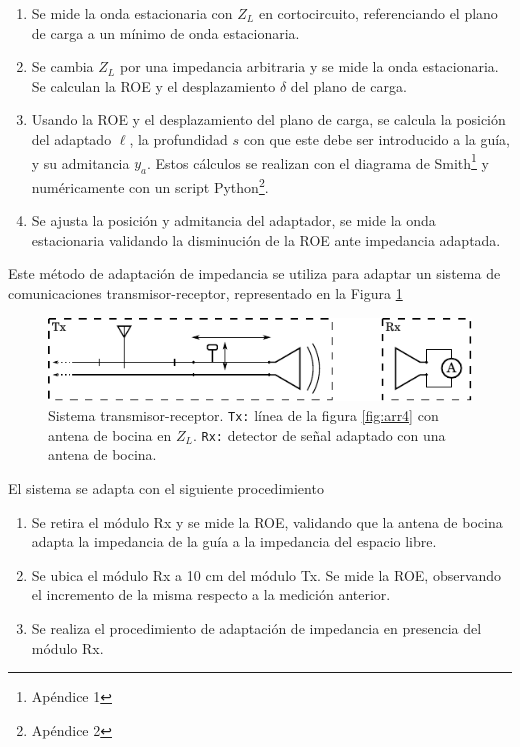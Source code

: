 \documentclass[11pt,a4paper]{article}
\begin{document}
\begin{multicols}{2}
\begin{enumerate}
    \item Se mide la onda estacionaria con $Z_L$ en cortocircuito, referenciando el plano de carga a un mínimo de onda estacionaria.
    \item Se cambia $Z_L$ por una impedancia arbitraria y se mide la onda estacionaria. Se calculan la ROE y el desplazamiento $\delta$ del plano de carga.
    \item Usando la ROE y el desplazamiento del plano de carga, se calcula la posición del adaptado $\ell$, la profundidad $s$ con que este debe ser introducido a la guía, y su admitancia $y_a$. 
    Estos cálculos se realizan con el diagrama de Smith\footnote{Apéndice 1} y numéricamente con un script Python\footnote{Apéndice 2}.
    \item Se ajusta la posición y admitancia del adaptador, se mide la onda estacionaria validando la disminución de la ROE ante impedancia adaptada.
\end{enumerate}

Este método de adaptación de impedancia se utiliza para adaptar un sistema de comunicaciones transmisor-receptor, representado en la Figura \ref{fig:sistema}

\begin{figure}[H]
    \centering
    \includegraphics[width=\linewidth]{Images/sistema.pdf}
    \caption{Sistema transmisor-receptor.
    \texttt{Tx:} línea de la figura \ref{fig:arr4} con antena de bocina en $Z_L$. 
    \texttt{Rx:} detector de señal adaptado con una antena de bocina.}
    \label{fig:sistema}
\end{figure}

El sistema se adapta con el siguiente procedimiento
\begin{enumerate}
    \item Se retira el módulo Rx y se mide la ROE, validando que la antena de bocina adapta la impedancia de la guía a la impedancia del espacio libre.
    \item Se ubica el módulo Rx a 10 cm del módulo Tx. Se mide la ROE, observando el incremento de la misma respecto a la medición anterior.
    \item Se realiza el procedimiento de adaptación de impedancia en presencia del módulo Rx.
\end{enumerate}


\end{multicols}
\end{document}
